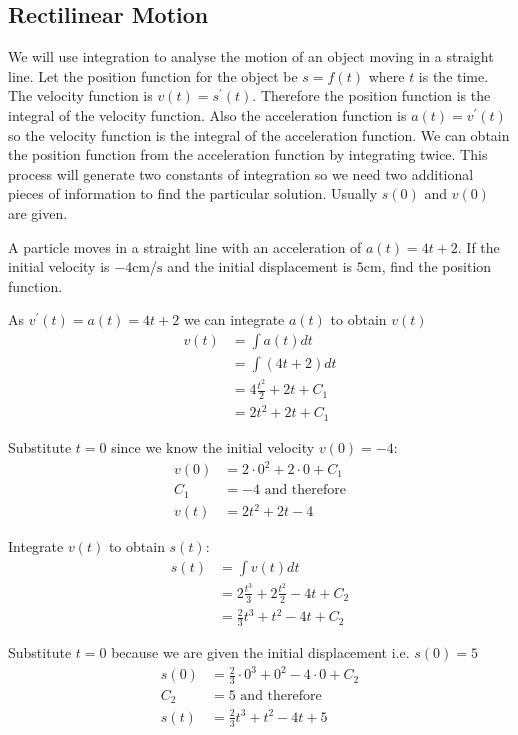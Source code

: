 \subsection*{Rectilinear Motion}
We will use integration to analyse the motion of an object moving in a straight line. Let
the position function for the object be $s =f (t)$ where $t$ is the time. The velocity function is $v (t) =s^{ \prime } (t)$. Therefore the position function is the integral of the velocity function. Also
the acceleration function is $a (t) =v^{ \prime } (t)$ so the velocity function is the integral of the acceleration function. We can obtain
the position function from the acceleration function by integrating twice. This process will generate
two constants of integration so we need two additional pieces of information to find the particular solution. Usually
$s (0)$ and $v (0)$ are given. 

\example A particle moves in a straight line with an acceleration of $a (t) =4 t +2$. If the initial velocity is $ -4 \mbox{cm}$/$\mbox{s}$ and the initial displacement is $5 \mbox{cm}$, find the position function. 

\solution \begin{multicols}{2}
As $v^{ \prime } (t) =a (t) =4 t +2$ we can integrate $a (t)$ to obtain $v (t)$
\begin{align*}v(t)&=\int a(t)dt\\
&=\int (4t+2)dt\\
&=4 \frac{t^{2}}{2} +2 t +C_{1} \\
&=2 t^{2} +2 t +C_{1}
\end{align*}

Substitute $t =0$ since we know the initial velocity $v(0)=-4$:
\begin{align*}v (0) &  = 2 \cdot 0^{2} +2 \cdot 0 +C_{1}\\
C_{1} &  =  -4\text{ and therefore} \\
v (t) &  = 2 t^{2} +2 t -4\end{align*}

Integrate $v (t)$ to obtain $s (t)$:
\begin{align*}s(t)&=\int v(t)dt\\
&=2 \frac{t^{3}}{3} +2 \frac{t^{2}}{2} -4 t +C_{2} \\
 &  = \frac{2}{3} t^{3} +t^{2} -4 t +C_{2}\end{align*}

Substitute $t =0$ because we are given the initial displacement i.e. $s (0) =5$
\begin{align*}s (0) &  = \frac{2}{3} \cdot 0^{3} +0^{2} -4 \cdot 0 +C_{2}\\
C_{2} &  = 5\text{ and therefore} \\
s (t) &  = \frac{2}{3} t^{3} +t^{2} -4 t +5\end{align*}
\end{multicols}

